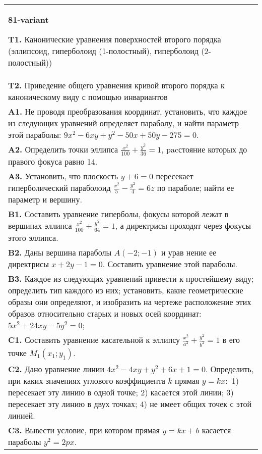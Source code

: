 \documentclass{article}
\begin{document}
\begin{tabular}{m{17cm}}
\textbf{81-variant}
\newline

\textbf{T1.} Канонические уравнения поверхностей второго порядка (эллипсоид, гиперболоид (1-полостный), гиперболоид (2-полостный)) \\
\textbf{T2.} Приведение общего уравнения кривой второго порядка к каноническому виду с помощью инвариантов \\
\textbf{A1.} Не проводя преобразования координат, установить, что каждое из следующих уравнений определяет параболу, и найти параметр этой параболы: $9 x^2-6 x y+y^2-50 x+50 y-275=0$. \\
\textbf{A2.} Определить точки эллипса $\frac{x^2}{100}+\frac{y^2}{36}=1$, pacстояние которых до правого фокуса равно 14. \\
\textbf{A3.} Установить, что плоскость $y+6=0$ пересекает гиперболический параболоид $\frac{x^2}{5}-\frac{y^2}{4}=6 z$ по параболе; найти ее параметр и вершину. \\
\textbf{B1.} Составить уравнение гиперболы, фокусы которой лежат в вершинах эллинса $\frac{x^2}{100}+\frac{y^2}{64}=1$, а директрисы проходят через фокусы этого эллипса. \\
\textbf{B2.} Даны вершина параболы $A(-2 ;-1)$ и урав нение ее директрисы $x+2 y-1=0$. Составить уравнение этой параболы. \\
\textbf{B3.} Каждое из следующих уравнений привести к простейшему виду; определить тип каждого из них; установить, какие геометрические образы они определяют, и изобразить на чертеже расположение этих образов относительно старых и новых осей координат: $5 x^2+24 x y-5 y^2=0$; \\
\textbf{C1.} Составить уравнение касательной к эллипсу $\frac{x^2}{a^2}+\frac{y^2}{b^2}=1$ в его точке $M_1\left(x_1 ; y_1\right)$. \\
\textbf{C2.} Дано уравнение линии $4 x^2-4 x y+y^2+6 x+1=0$. Определить, при каких значениях углового коэффициента $k$ прямая $y=k x:$ 1) пересекает эту линию в одной точке; 2) касается этой линии; 3) пересекает эту линию в двух точках; 4) не имеет общих точек с этой линией. \\
\textbf{C3.} Вывести условие, при котором прямая $y=k x+b$ касается параболы $y^2=2 p x$. \\

\end{tabular}
\vspace{1cm}
\end{document}
